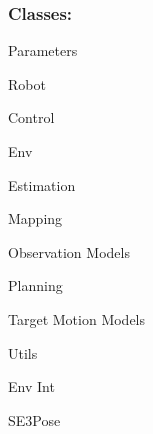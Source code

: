 \subsubsection*{Classes\+:}


\begin{DoxyItemize}
\item Parameters
\item Robot
\item Control
\item Env
\item Estimation
\item Mapping
\item Observation Models
\item Planning
\item Target Motion Models
\item Utils
\item Env Int
\item S\+E3\+Pose 
\end{DoxyItemize}
